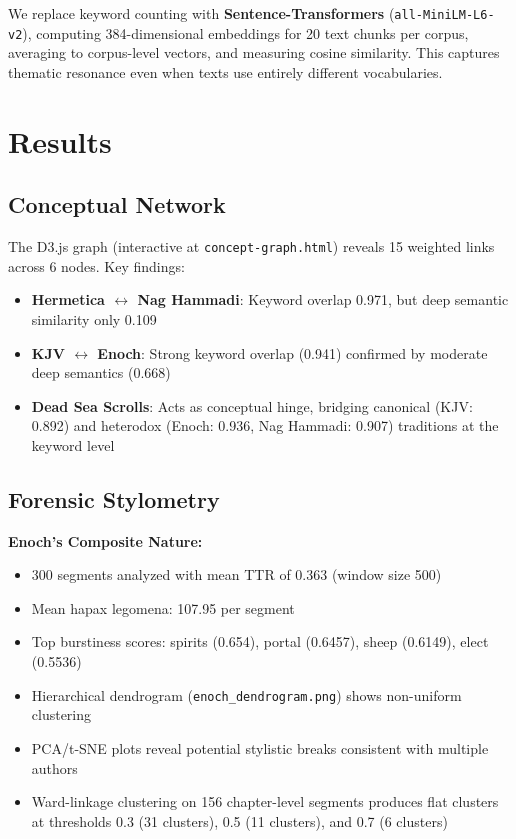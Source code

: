 \documentclass[11pt]{article}
\begin{document}
We replace keyword counting with \textbf{Sentence-Transformers} (\texttt{all-MiniLM-L6-v2}), computing 384-dimensional embeddings for 20 text chunks per corpus, averaging to corpus-level vectors, and measuring cosine similarity. This captures thematic resonance even when texts use entirely different vocabularies.

\section{Results}

\subsection{Conceptual Network}

The D3.js graph (interactive at \texttt{concept-graph.html}) reveals 15 weighted links across 6 nodes. Key findings:
\begin{itemize}
    \item \textbf{Hermetica $\leftrightarrow$ Nag Hammadi}: Keyword overlap 0.971, but deep semantic similarity only 0.109
    \item \textbf{KJV $\leftrightarrow$ Enoch}: Strong keyword overlap (0.941) confirmed by moderate deep semantics (0.668)
    \item \textbf{Dead Sea Scrolls}: Acts as conceptual hinge, bridging canonical (KJV: 0.892) and heterodox (Enoch: 0.936, Nag Hammadi: 0.907) traditions at the keyword level
\end{itemize}

\subsection{Forensic Stylometry}

\textbf{Enoch's Composite Nature:}
\begin{itemize}
    \item 300 segments analyzed with mean TTR of 0.363 (window size 500)
    \item Mean hapax legomena: 107.95 per segment
    \item Top burstiness scores: spirits (0.654), portal (0.6457), sheep (0.6149), elect (0.5536)
    \item Hierarchical dendrogram (\texttt{enoch\_dendrogram.png}) shows non-uniform clustering
    \item PCA/t-SNE plots reveal potential stylistic breaks consistent with multiple authors
    \item Ward-linkage clustering on 156 chapter-level segments produces flat clusters at thresholds 0.3 (31 clusters), 0.5 (11 clusters), and 0.7 (6 clusters)
\end{itemize}
\end{document}
